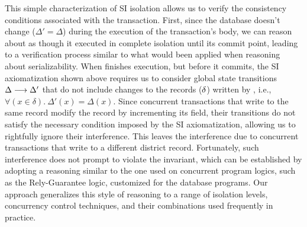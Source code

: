 
This simple characterization of SI isolation allows us to verify the
consistency conditions associated with the  transaction.
First, since the database doesn't change ($\Delta' = \Delta$) during
the execution of the transaction's body, we can reason about
 as though it executed in complete isolation until its
commit point, leading to a verification process similar to what would
been applied when reasoning about serializability.  When
 finishes execution, but before it commits, the SI
axiomatization shown above requires us to consider global state
transitions $\Delta \longrightarrow \Delta'$ that do not include changes
to the records ($\delta$) written by , i.e.,
$\forall(x\in\delta).~\Delta'(x) = \Delta(x)$. Since concurrent
 transactions that write to the same  record
modify the record by incrementing its  field, their
transitions do not satisfy the necessary condition imposed by the SI
axiomatization, allowing us to rightfully ignore their interference.
This leaves the interference due to concurrent 
transactions that write to a different district record.  Fortunately,
such interference does not prompt  to violate the
invariant, which can be established by adopting a reasoning similar to
the one used on concurrent program logics, such as the Rely-Guarantee
logic, customized for the database programs. Our approach generalizes
this style of reasoning to a range of isolation levels, concurrency
control techniques, and their combinations used frequently in practice.

